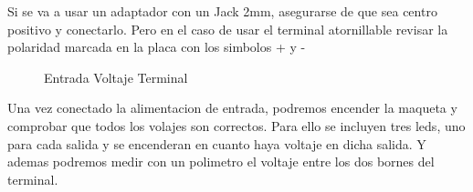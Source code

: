 Si se va a usar un adaptador con un Jack 2mm, asegurarse de que sea centro positivo y conectarlo.
Pero en el caso de usar el terminal atornillable revisar la polaridad marcada en la placa con los simbolos + y -
\begin{figure}[H]
\centering
{}
\caption{Entrada Voltaje Terminal}
\label{fig:VccInTerminal2}
\end{figure}


Una vez conectado la alimentacion de entrada, podremos encender la maqueta y comprobar que todos los volajes
son correctos. Para ello se incluyen tres leds, uno para cada salida y se encenderan en cuanto haya voltaje
en dicha salida. Y ademas podremos medir con un polimetro
el voltaje entre los dos bornes del terminal.

